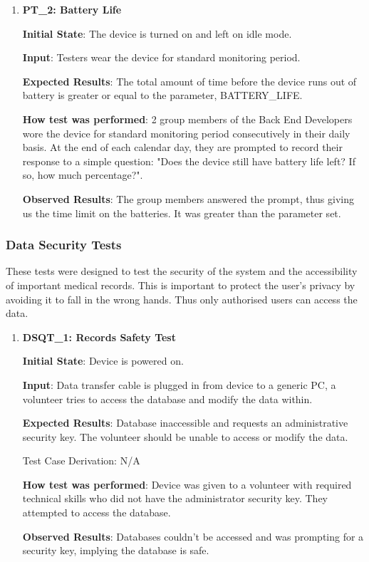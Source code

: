 \documentclass[12pt, titlepage]{article}
\begin{document}
\begin{enumerate}
  \item\textbf{{PT\_2: Battery Life\\}}\label{PT2}

  \textbf{Initial State}: The device is turned on and left on idle mode.

  \textbf{Input}: Testers wear the device for standard monitoring period.

  \textbf{Expected Results}: The total amount of time before the device runs out of battery is greater or equal to the parameter, BATTERY\_LIFE.

  \textbf{How test was performed}: 2 group members of the Back End Developers wore the device for standard monitoring period consecutively in their daily basis. At the end of each calendar day, they are prompted to record their response to a simple question: "Does the device still have battery life left? If so, how much percentage?".

  \textbf{Observed Results}: The group members answered the prompt, thus giving us the time limit on the batteries. It was greater than the parameter set.

\end{enumerate}

\subsubsection{Data Security Tests}

These tests were designed to test the security of the system and the accessibility of important medical records. This is important to protect the user's privacy by avoiding it to fall in the wrong hands. Thus only authorised users can access the data.

\begin{enumerate}

  \item{\textbf{DSQT\_1: Records Safety Test}}\label{DSQT1}

  \textbf{Initial State}: Device is powered on.

  \textbf{Input}: Data transfer cable is plugged in from device to a generic PC, a volunteer tries to access the database and modify the data within.

  \textbf{Expected Results}: Database inaccessible and requests an administrative security key. The volunteer should be unable to access or modify the data.

  Test Case Derivation: N/A

  \textbf{How test was performed}: Device was given to a volunteer with required technical skills who did not have the administrator security key. They attempted to access the database.

  \textbf{Observed Results}: Databases couldn't be accessed and was prompting for a security key, implying the database is safe.

\end{enumerate}
\end{document}
